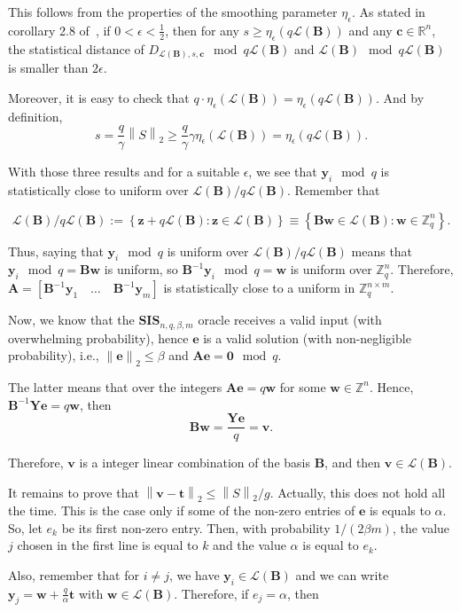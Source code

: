 \documentclass[a4paper,11pt]{article}
\let\vec\mathbf %
\newcommand\R{{\mathbb R}}
\newcommand\Zqn{{\mathbb Z}_q^n}
\newcommand\Zn{{\mathbb Z}^n}
\newcommand\Zqnm{{\mathbb Z}_q^{n\times m}}
\newcommand\A{{\mathbf A}}
\newcommand\LB{\mathcal{L}\left(\vec B\right)}
\newcommand\DLs[1]{D_{\LB, s, #1}}
\newcommand\smooth{\eta_\epsilon}
\newcommand\SIS{\textbf{SIS}_{n, q, \beta, m}}
\newcommand{\norm}[1]{\left\lVert #1 \right\rVert_2}
\theoremstyle{definition}
\theoremstyle{remark}
\begin{document}
This follows from the properties of the smoothing parameter $\smooth$. As 
stated in corollary 2.8 of~\cite{gpv07}, if $0 < \epsilon < \frac 1 2$, then 
for any $s \ge \smooth(q\LB)$ and any $\vec c \in \R^n$, the statistical 
distance of $\DLs{\vec c} \mod q\LB$ and $\LB \mod q\LB$ is smaller than 
$2\epsilon$.

Moreover, it is easy to check that $q \cdot \smooth(\LB) = \smooth(q\LB)$. And 
by definition, 
$$s =\frac{q}{\gamma}\norm{S} \ge \frac{q}{\gamma}\gamma\smooth(\LB) = 
\smooth(q\LB).$$

With those three results and for a suitable $\epsilon$, we see that $\vec y_i 
\mod q$ is statistically close to uniform over $\LB/q\LB$. Remember that 

$$\LB/q\LB := \left\{ \vec z + q\LB : \vec z \in \LB \right\} \equiv \left\{ 
\vec B \vec w \in \LB : \vec w \in \Zqn \right\}.$$

Thus, saying that $\vec y_i \mod q$ is uniform over $\LB/q\LB$ means that 
$\vec y_i \mod q = \vec B \vec w$ is uniform, so $\vec{B}^{-1}\vec y_i \mod q = 
\vec w$ is uniform over $\Zqn$. Therefore, $\A = [\vec{B}^{-1}\vec y_1 \quad 
\dots \quad \vec{B}^{-1}\vec y_m]$ is statistically close to a uniform in 
$\Zqnm$.

Now, we know that the $\SIS$ oracle receives a valid input (with 
overwhelming probability), hence $\vec e$ is a valid solution (with 
non-negligible probability), i.e., $\norm{\vec e} \le \beta$ and $\A \vec e = 
\vec 0 \mod q$. 

The latter means that over the integers $\A \vec e = q\vec w$ for some $\vec w 
\in \Zn$. Hence, $\vec{B}^{-1}\vec Y\vec e = q\vec w$, then $$\vec{B}\vec w 
=\frac{\vec Y\vec e }{q} = \vec v.$$

Therefore, $\vec v$ is a integer linear combination of the basis $\vec B$, and 
then $\vec v \in \LB$.

It remains to prove that $\norm{\vec v - \vec t} \le \norm{S} / g$. Actually, 
this does not hold all the time. This is the case only if some of the non-zero 
entries of $\vec e$ is equals to $\alpha$. So, let $e_k$ be its first 
non-zero entry. Then, with probability $1/(2\beta m)$, the value $j$ chosen in 
the first line is equal to $k$ and the value $\alpha$ is equal to $e_k$.

Also, remember that for $i \not=j$, we have $\vec y_i \in \LB$ and we can 
write $\vec y_j =  \vec{w} + \frac{q}{\alpha} \vec t$ with $\vec w \in \LB$. 
Therefore, if $e_j = \alpha$, then
\end{document}
